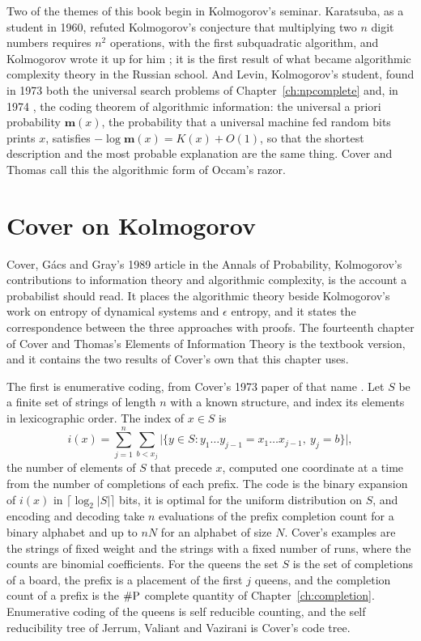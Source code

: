 Two of the themes of this book begin in Kolmogorov's seminar. Karatsuba, as a student in 1960, refuted Kolmogorov's conjecture that multiplying two $n$ digit numbers requires $n^2$ operations, with the first subquadratic algorithm, and Kolmogorov wrote it up for him \cite{KaratsubaOfman}; it is the first result of what became algorithmic complexity theory in the Russian school. And Levin, Kolmogorov's student, found in 1973 both the universal search problems of Chapter~\ref{ch:npcomplete} and, in 1974 \cite{Levin1974}, the coding theorem of algorithmic information: the universal a priori probability $\mathbf{m}(x)$, the probability that a universal machine fed random bits prints $x$, satisfies $-\log \mathbf{m}(x) = K(x) + O(1)$, so that the shortest description and the most probable explanation are the same thing. Cover and Thomas call this the algorithmic form of Occam's razor.

\section{Cover on Kolmogorov}

Cover, G\'acs and Gray's 1989 article \cite{CoverGacsGray} in the Annals of Probability, Kolmogorov's contributions to information theory and algorithmic complexity, is the account a probabilist should read. It places the algorithmic theory beside Kolmogorov's work on entropy of dynamical systems and $\epsilon$ entropy, and it states the correspondence between the three approaches with proofs. The fourteenth chapter of Cover and Thomas's Elements of Information Theory \cite{CoverThomas} is the textbook version, and it contains the two results of Cover's own that this chapter uses.

The first is enumerative coding, from Cover's 1973 paper of that name \cite{Cover1973}. Let $S$ be a finite set of strings of length $n$ with a known structure, and index its elements in lexicographic order. The index of $x \in S$ is
\[
i(x) = \sum_{j=1}^{n} \sum_{b < x_j} \big| \{ y \in S : y_1 \dots y_{j-1} = x_1 \dots x_{j-1}, \ y_j = b \} \big| ,
\]
the number of elements of $S$ that precede $x$, computed one coordinate at a time from the number of completions of each prefix. The code is the binary expansion of $i(x)$ in $\lceil \log_2 |S| \rceil$ bits, it is optimal for the uniform distribution on $S$, and encoding and decoding take $n$ evaluations of the prefix completion count for a binary alphabet and up to $n N$ for an alphabet of size $N$. Cover's examples are the strings of fixed weight and the strings with a fixed number of runs, where the counts are binomial coefficients. For the queens the set $S$ is the set of completions of a board, the prefix is a placement of the first $j$ queens, and the completion count of a prefix is the $\#\mathrm{P}$ complete quantity of Chapter~\ref{ch:completion}. Enumerative coding of the queens is self reducible counting, and the self reducibility tree of Jerrum, Valiant and Vazirani is Cover's code tree.

